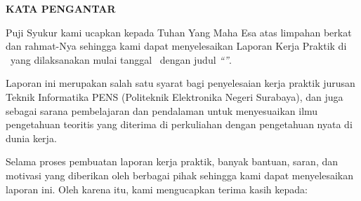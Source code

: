 \cleardoublepage
{}
{}
\begin{center}
  {\FontJudulHalaman\bfseries KATA PENGANTAR\par}
\end{center}
\vspace{12pt}

Puji Syukur kami ucapkan kepada Tuhan Yang Maha Esa atas limpahan berkat dan rahmat-Nya
sehingga kami dapat menyelesaikan Laporan Kerja Praktik di \NamaPerusahaan\ yang
dilaksanakan mulai tanggal \PeriodeKP\ dengan judul \textit{``\JudulKP''}.

Laporan ini merupakan salah satu syarat bagi penyelesaian kerja praktik jurusan Teknik
Informatika PENS (Politeknik Elektronika Negeri Surabaya), dan juga sebagai sarana
pembelajaran dan pendalaman untuk menyesuaikan ilmu pengetahuan teoritis yang diterima di
perkuliahan dengan pengetahuan nyata di dunia kerja.

Selama proses pembuatan laporan kerja praktik, banyak bantuan, saran, dan motivasi yang
diberikan oleh berbagai pihak sehingga kami dapat menyelesaikan laporan ini. Oleh karena
itu, kami mengucapkan terima kasih kepada:

